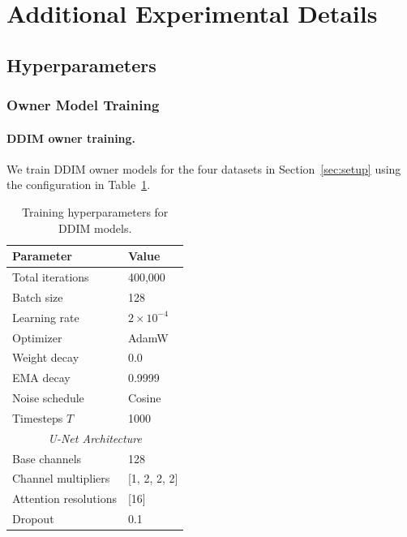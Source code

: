\documentclass{article}
\begin{document}




\appendix

\section{Additional Experimental Details}

\label{app:details}

\subsection{Hyperparameters}
\label{app:hyperparams}

\subsubsection{Owner Model Training}

\paragraph{DDIM owner training.} We train DDIM owner models for the four datasets in Section~\ref{sec:setup} using the configuration in Table~\ref{tab:hyperparams_ddim}.

\begin{table}[!htbp]
\caption{Training hyperparameters for DDIM models.}
\label{tab:hyperparams_ddim}
\centering
\begin{tabular}{ll}
\toprule
Parameter & Value \\
\midrule
Total iterations & 400,000 \\
Batch size & 128 \\
Learning rate & $2 \times 10^{-4}$ \\
Optimizer & AdamW \\
Weight decay & 0.0 \\
EMA decay & 0.9999 \\
Noise schedule & Cosine \\
Timesteps $T$ & 1000 \\
\midrule
\multicolumn{2}{c}{\textit{U-Net Architecture}} \\
Base channels & 128 \\
Channel multipliers & [1, 2, 2, 2] \\
Attention resolutions & [16] \\
Dropout & 0.1 \\
\bottomrule
\end{tabular}
\end{table}
\end{document}
